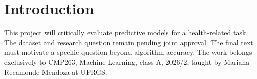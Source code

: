 \section{Introduction}
This project will critically evaluate predictive models for a health-related
task. The dataset and research question remain pending joint approval.
The final text must motivate a specific question beyond algorithm accuracy.
The work belongs exclusively to CMP263, Machine Learning, class A, 2026/2,
taught by Mariana Recamonde Mendoza at UFRGS.
